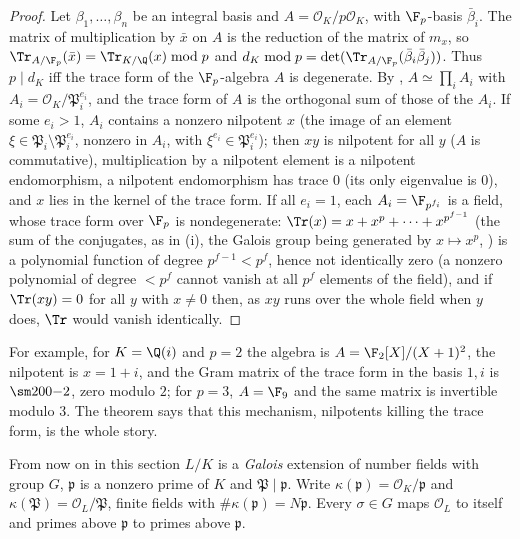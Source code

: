 \begin{proof}
Let $\beta_1,\dots,\beta_n$ be an integral basis and $A=\mathcal O_K/p\mathcal O_K$, with $\F_p$-basis $\bar\beta_i$. The matrix of multiplication by
$\bar x$ on $A$ is the reduction of the matrix of $m_x$, so $\Tr_{A/\F_p}(\bar x)=\Tr_{K/\Q}(x)\bmod p$ and $d_K\bmod p=\det(\Tr_{A/\F_p}(\bar\beta_i
\bar\beta_j))$. Thus $p\mid d_K$ iff the trace form of the $\F_p$-algebra $A$ is degenerate. By , $A\simeq\prod_iA_i$ with
$A_i=\mathcal O_K/\mathfrak P_i^{e_i}$, and the trace form of $A$ is the orthogonal sum of those of the $A_i$. If some $e_i>1$, $A_i$ contains a
nonzero nilpotent $x$ (the image of an element $\xi\in\mathfrak P_i\setminus\mathfrak P_i^{e_i}$, nonzero in $A_i$, with $\xi^{e_i}\in\mathfrak P_i^{e_i}$); then $xy$
is nilpotent for all $y$ ($A$ is commutative), multiplication by a nilpotent element is a nilpotent endomorphism, a nilpotent endomorphism has trace $0$
(its only eigenvalue is $0$), and $x$ lies in the kernel of the trace form. If all $e_i=1$, each $A_i=\F_{p^{f_i}}$ is a field, whose trace form over
$\F_p$ is nondegenerate: $\Tr(x)=x+x^p+\dots+x^{p^{f-1}}$ (the sum of the conjugates, as in (i), the Galois group being
generated by $x\mapsto x^p$, ) is a polynomial function of degree $p^{f-1}<p^f$, hence not identically zero (a nonzero polynomial of degree
$<p^f$ cannot vanish at all $p^f$ elements of the field), and if $\Tr(xy)=0$ for all $y$ with $x\ne0$ then, as $xy$ runs over the whole field when $y$ does,
$\Tr$ would vanish identically.
\end{proof}

For example, for $K=\Q(i)$ and $p=2$ the algebra is $A=\F_2[X]/(X+1)^2$, the nilpotent is $x=1+i$, and the Gram matrix of the trace form in the basis $1,i$ is
$\sm200{-2}$, zero modulo $2$; for $p=3$, $A=\F_9$ and the same matrix is invertible modulo $3$. The theorem says that this mechanism, nilpotents killing the
trace form, is the whole story.

From now on in this section $L/K$ is a \emph{Galois} extension of number fields with group $G$, $\mathfrak p$ is a nonzero prime of $K$ and
$\mathfrak P\mid\mathfrak p$. Write $\kappa(\mathfrak p)=\mathcal O_K/\mathfrak p$ and $\kappa(\mathfrak P)=\mathcal O_L/\mathfrak P$, finite fields with
$\#\kappa(\mathfrak p)=N\mathfrak p$. Every $\sigma\in G$ maps $\mathcal O_L$ to itself and primes above $\mathfrak p$ to primes above $\mathfrak p$.

